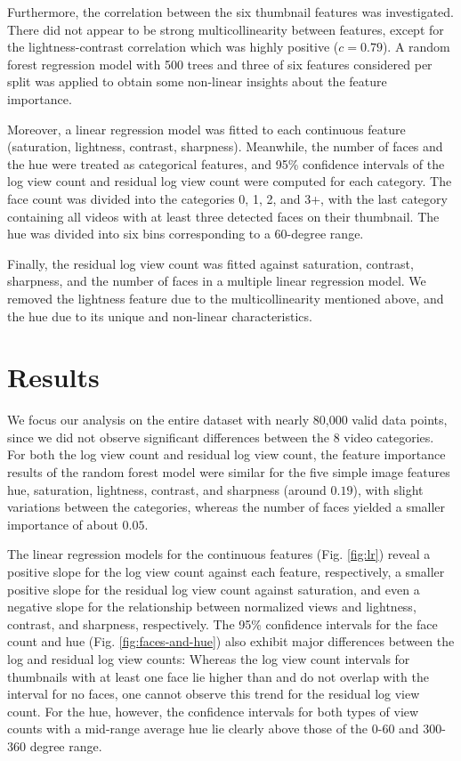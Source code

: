 \documentclass{article}
\begin{document}
Furthermore, the correlation between the six thumbnail features was investigated. There did not appear to be strong multicollinearity between features, except for the lightness-contrast correlation which was highly positive ($c = 0.79$). A random forest regression model with 500 trees and three of six features considered per split was applied to obtain some non-linear insights about the feature importance.

Moreover, a linear regression model was fitted to each continuous feature (saturation, lightness, contrast, sharpness). Meanwhile, the number of faces and the hue were treated as categorical features, and 95\% confidence intervals of the log view count and residual log view count were computed for each category. The face count was divided into the categories 0, 1, 2, and 3+, with the last category containing all videos with at least three detected faces on their thumbnail. The hue was divided into six bins corresponding to a 60-degree range.

Finally, the residual log view count was fitted against saturation, contrast, sharpness, and the number of faces in a multiple linear regression model. We removed the lightness feature due to the multicollinearity mentioned above, and the hue due to its unique and non-linear characteristics.

\section{Results}
We focus our analysis on the entire dataset with nearly 80,000 valid data points, since we did not observe significant differences between the 8 video categories. For both the log view count and residual log view count, the feature importance results of the random forest model were similar for the five simple image features hue, saturation, lightness, contrast, and sharpness (around $0.19$), with slight variations between the categories, whereas the number of faces yielded a smaller importance of about $0.05$.

The linear regression models for the continuous features (Fig. \ref{fig:lr}) reveal a positive slope for the log view count against each feature, respectively, a smaller positive slope for the residual log view count against saturation, and even a negative slope for the relationship between normalized views and lightness, contrast, and sharpness, respectively. The 95\% confidence intervals for the face count and hue (Fig. \ref{fig:faces-and-hue}) also exhibit major differences between the log and residual log view counts: Whereas the log view count intervals for thumbnails with at least one face lie higher than and do not overlap with the interval for no faces, one cannot observe this trend for the residual log view count. For the hue, however, the confidence intervals for both types of view counts with a mid-range average hue lie clearly above those of the 0-60 and 300-360 degree range.
\end{document}
